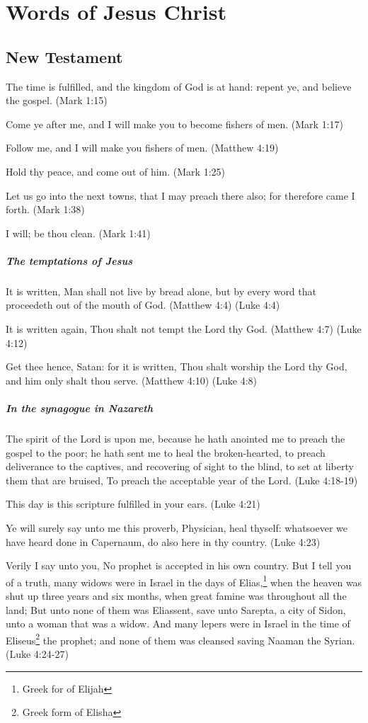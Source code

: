 \chapter{Words of Jesus Christ}

\section{New Testament}

The time is fulfilled, and the kingdom of God is at hand: repent ye, and believe the gospel. (Mark 1:15)

Come ye after me, and I will make you to become fishers of men. (Mark 1:17)

Follow me, and I will make you fishers of men. (Matthew 4:19)

Hold thy peace, and come out of him. (Mark 1:25)

Let us go into the next towns, that I may preach there also; for therefore came I forth. (Mark 1:38)

I will; be thou clean. (Mark 1:41)

\paragraph{The temptations of Jesus}
It is written, Man shall not live by bread alone, but by every word that proceedeth out of the mouth of God. (Matthew 4:4) (Luke 4:4)

It is written again, Thou shalt not tempt the Lord thy God. (Matthew 4:7) (Luke 4:12)

Get thee hence, Satan: for it is written, Thou shalt worship the Lord thy God, and him only shalt thou serve. (Matthew 4:10) (Luke 4:8)

\paragraph{In the synagogue in Nazareth}
The spirit of the Lord is upon me, because he hath anointed me to preach the gospel to the poor; he hath sent me to heal the broken-hearted, to preach deliverance to the captives, and recovering of sight to the blind, to set at liberty them that are bruised, To preach the acceptable year of the Lord. (Luke 4:18-19)

This day is this scripture fulfilled in your ears. (Luke 4:21)

Ye will surely say unto me this proverb, Physician, heal thyself: whatsoever we have heard done in Capernaum, do also here in thy country. (Luke 4:23)

Verily I say unto you, No prophet is accepted in his own country. But I tell you of a truth, many widows were in Israel in the days of Elias,\footnote{Greek for of Elijah} when the heaven was shut up three years and six months, when great famine was throughout all the land; But unto none of them was Elias\footnotemark[\value{footnote}] sent, save unto Sarepta, a city of Sidon, unto a woman that was a widow. And many lepers were in Israel in the time of Eliseus\footnote{Greek form of Elisha} the prophet; and none of them was cleansed saving Naaman the Syrian. (Luke 4:24-27)


